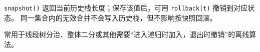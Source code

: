 \texttt{snapshot()} 返回当前历史栈长度；保存该值后，可用 \texttt{rollback(t)} 撤销到对应状态。
同一集合内的无效合并不会写入历史栈，但不影响按快照回滚。

常用于线段树分治、整体二分或其他需要“进入递归时加入，退出时撤销”的离线算法。
